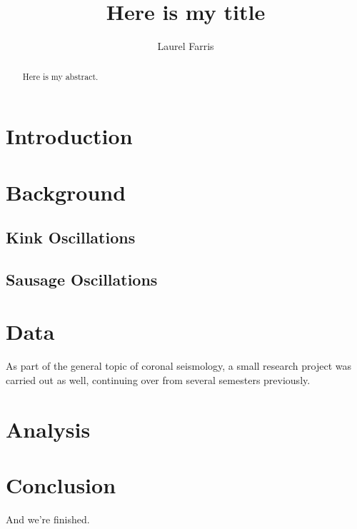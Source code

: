 \documentclass[preprint2]{aastex}
\begin{document}
\title{Here is my title}
\author{Laurel Farris}

\begin{abstract}
Here is my abstract.
\end{abstract}

\section{Introduction}

\section{Background}

\subsection{Kink Oscillations}
\subsection{Sausage Oscillations}


\section{Data}
As part of the general topic of coronal seismology,
a small research project was carried out as well, continuing
over from several semesters previously.

\section{Analysis}

\section{Conclusion}
And we're finished.
\end{document}
